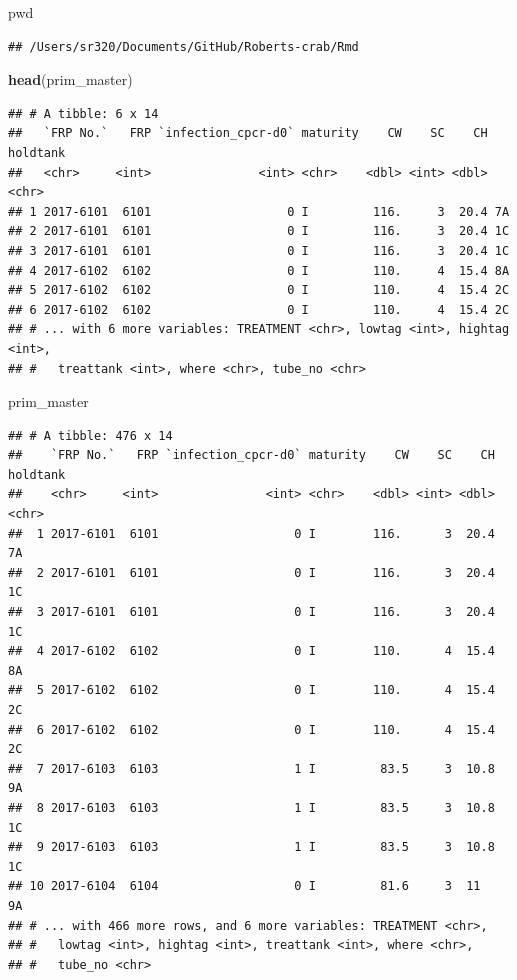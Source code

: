 \documentclass[]{article}
\newenvironment{Shaded}{\begin{snugshade}}{\end{snugshade}}
\newcommand{\KeywordTok}[1]{\textcolor[rgb]{0.13,0.29,0.53}{\textbf{#1}}}
\newcommand{\BuiltInTok}[1]{#1}
\newcommand{\NormalTok}[1]{#1}
\begin{document}
\begin{Shaded}
\begin{Highlighting}[]
\BuiltInTok{pwd}
\end{Highlighting}
\end{Shaded}

\begin{verbatim}
## /Users/sr320/Documents/GitHub/Roberts-crab/Rmd
\end{verbatim}

\begin{Shaded}
\begin{Highlighting}[]
\KeywordTok{head}\NormalTok{(prim_master)}
\end{Highlighting}
\end{Shaded}

\begin{verbatim}
## # A tibble: 6 x 14
##   `FRP No.`   FRP `infection_cpcr-d0` maturity    CW    SC    CH holdtank
##   <chr>     <int>               <int> <chr>    <dbl> <int> <dbl> <chr>   
## 1 2017-6101  6101                   0 I         116.     3  20.4 7A      
## 2 2017-6101  6101                   0 I         116.     3  20.4 1C      
## 3 2017-6101  6101                   0 I         116.     3  20.4 1C      
## 4 2017-6102  6102                   0 I         110.     4  15.4 8A      
## 5 2017-6102  6102                   0 I         110.     4  15.4 2C      
## 6 2017-6102  6102                   0 I         110.     4  15.4 2C      
## # ... with 6 more variables: TREATMENT <chr>, lowtag <int>, hightag <int>,
## #   treattank <int>, where <chr>, tube_no <chr>
\end{verbatim}

\begin{Shaded}
\begin{Highlighting}[]
\NormalTok{prim_master}
\end{Highlighting}
\end{Shaded}

\begin{verbatim}
## # A tibble: 476 x 14
##    `FRP No.`   FRP `infection_cpcr-d0` maturity    CW    SC    CH holdtank
##    <chr>     <int>               <int> <chr>    <dbl> <int> <dbl> <chr>   
##  1 2017-6101  6101                   0 I        116.      3  20.4 7A      
##  2 2017-6101  6101                   0 I        116.      3  20.4 1C      
##  3 2017-6101  6101                   0 I        116.      3  20.4 1C      
##  4 2017-6102  6102                   0 I        110.      4  15.4 8A      
##  5 2017-6102  6102                   0 I        110.      4  15.4 2C      
##  6 2017-6102  6102                   0 I        110.      4  15.4 2C      
##  7 2017-6103  6103                   1 I         83.5     3  10.8 9A      
##  8 2017-6103  6103                   1 I         83.5     3  10.8 1C      
##  9 2017-6103  6103                   1 I         83.5     3  10.8 1C      
## 10 2017-6104  6104                   0 I         81.6     3  11   9A      
## # ... with 466 more rows, and 6 more variables: TREATMENT <chr>,
## #   lowtag <int>, hightag <int>, treattank <int>, where <chr>,
## #   tube_no <chr>
\end{verbatim}
\end{document}
